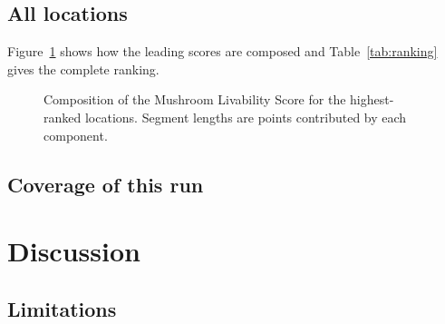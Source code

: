 \documentclass[11pt,a4paper]{article}
\newcommand{\MLSscore}{Mushroom Livability Score}
\begin{document}
\subsection{All locations}

Figure~\ref{fig:contrib} shows how the leading scores are composed and Table~\ref{tab:ranking} gives the
complete ranking.

\begin{figure}[ht]
\centering

\caption{Composition of the \MLSscore{} for the highest-ranked locations.
Segment lengths are points contributed by each component.}
\label{fig:contrib}
\end{figure}

\begin{table}[p]
\centering\footnotesize\setlength{\tabcolsep}{4.5pt}

\caption{Full ranking. Component columns are points contributed to the score.}
\label{tab:ranking}
\end{table}

\subsection{Coverage of this run}\label{sec:coverage}



\section{Discussion}



\subsection{Limitations}
\end{document}
